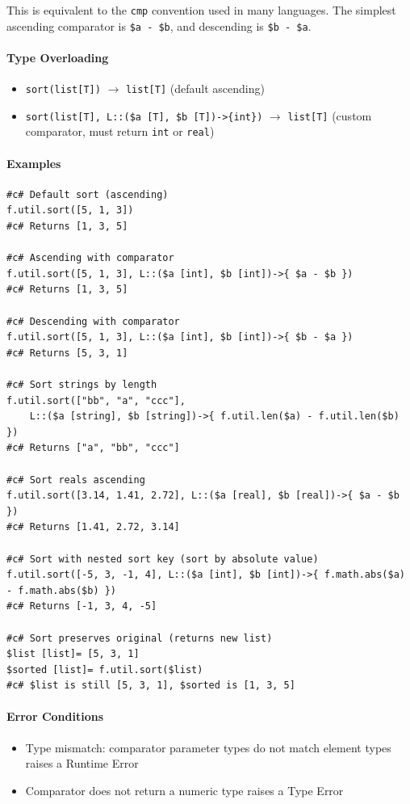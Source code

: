 This is equivalent to the \texttt{cmp} convention used in many languages. The simplest ascending comparator is \texttt{\$a - \$b}, and descending is \texttt{\$b - \$a}.

\paragraph{Type Overloading}
\begin{itemize}
\item \texttt{sort(list[T])} $\rightarrow$ \texttt{list[T]} (default ascending)
\item \texttt{sort(list[T], L::(\$a [T], \$b [T])->\{int\})} $\rightarrow$ \texttt{list[T]}
  (custom comparator, must return \texttt{int} or \texttt{real})
\end{itemize}

\paragraph{Examples}
\begin{verbatim}
#c# Default sort (ascending)
f.util.sort([5, 1, 3])
#c# Returns [1, 3, 5]

#c# Ascending with comparator
f.util.sort([5, 1, 3], L::($a [int], $b [int])->{ $a - $b })
#c# Returns [1, 3, 5]

#c# Descending with comparator
f.util.sort([5, 1, 3], L::($a [int], $b [int])->{ $b - $a })
#c# Returns [5, 3, 1]

#c# Sort strings by length
f.util.sort(["bb", "a", "ccc"],
    L::($a [string], $b [string])->{ f.util.len($a) - f.util.len($b) })
#c# Returns ["a", "bb", "ccc"]

#c# Sort reals ascending
f.util.sort([3.14, 1.41, 2.72], L::($a [real], $b [real])->{ $a - $b })
#c# Returns [1.41, 2.72, 3.14]

#c# Sort with nested sort key (sort by absolute value)
f.util.sort([-5, 3, -1, 4], L::($a [int], $b [int])->{ f.math.abs($a) - f.math.abs($b) })
#c# Returns [-1, 3, 4, -5]

#c# Sort preserves original (returns new list)
$list [list]= [5, 3, 1]
$sorted [list]= f.util.sort($list)
#c# $list is still [5, 3, 1], $sorted is [1, 3, 5]
\end{verbatim}

\paragraph{Error Conditions}
\begin{itemize}
\item Type mismatch: comparator parameter types do not match element types raises a Runtime Error
\item Comparator does not return a numeric type raises a Type Error
\end{itemize}


